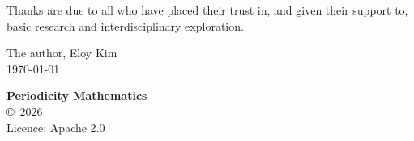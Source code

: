 Thanks are due to all who have placed their trust in, and given their support to, basic research and interdisciplinary exploration.

\vspace{1em}
\begin{flushright}
The author, Eloy Kim\\
\today
\end{flushright}

\vspace{2cm}
\begin{center}
    \textbf{Periodicity Mathematics}\\
    \copyright\ 2026 \\
    Licence: Apache 2.0
\end{center}

